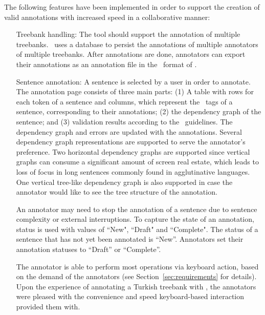 The following features have been implemented in order to support the creation of valid annotations with increased speed in a collaborative manner:
\begin{itemize}[before=\normalfont, font=\itshape, align=left,noitemsep,topsep=0pt,parsep=3pt,partopsep=0pt,labelsep=3pt,align=left]
    \item[Treebank handling:]
        The tool should support the annotation of multiple treebanks.
        \boatvtwo\ uses a database to persist the annotations of multiple annotators of multiple treebanks.
        After annotations are done, annotators can export their annotations as an annotation file in the \conllu\ format of \ud.

    \item[Sentence annotation:]
    	A sentence is selected by a user in order to annotate.
        The annotation page consists of three main parts: (1) A table with rows for each token of a sentence and columns, which represent the \ud\ tags of a sentence, corresponding to their annotations; (2) the dependency graph of the sentence; and (3) validation results according to the \ud\ guidelines.
        The dependency graph and errors are updated with the annotations.
        Several dependency graph representations are supported to serve the annotator's preference.
        Two horizontal dependency graphs are supported since vertical graphs can consume a significant amount of screen real estate, which leads to loss of focus in long sentences commonly found in agglutinative languages.
        One vertical tree-like dependency graph is also supported in case the annotator would like to see the tree structure of the annotation.

        An annotator may need to stop the annotation of a sentence due to sentence complexity or external interruptions.
        To capture the state of an annotation, status is used with values of ``New", ``Draft" and ``Complete".
        The status of a sentence that has not yet been annotated is ``New''.
	    Annotators set their annotation statuses to ``Draft'' or ``Complete''.

        The annotator is able to perform most operations via keyboard action, based on the demand of the annotators (see Section~\ref{sec:requirements} for details).
        Upon the experience of annotating a Turkish treebank with \boatvone, the annotators were pleased with the convenience and speed keyboard-based interaction provided them with.


\end{itemize}
